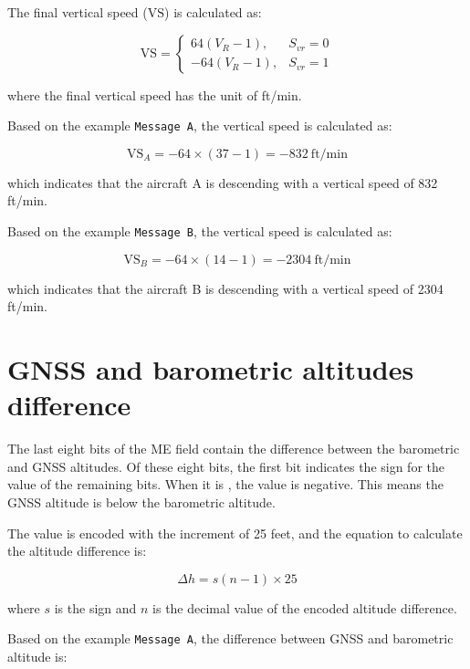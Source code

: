 The final vertical speed ($\mathrm{VS}$) is calculated as:

\begin{equation}
  \mathrm{VS} =   
   \begin{cases}
     64 (V_R - 1), & S_{vr} = 0 \\
     -64 (V_R - 1), & S_{vr} = 1
   \end{cases}
\end{equation}

where the final vertical speed has the unit of ft/min.

Based on the example \texttt{Message A}, the vertical speed is calculated as:

\begin{equation}
  \mathrm{VS}_A = -64 \times (37 -1) = -832 ~\text{ft/min}
\end{equation}

which indicates that the aircraft A is descending with a vertical speed of 832 ft/min.

Based on the example \texttt{Message B}, the vertical speed is calculated as:

\begin{equation}
  \mathrm{VS}_B = -64 \times (14 -1) = -2304 ~\text{ft/min}
\end{equation}

which indicates that the aircraft B is descending with a vertical speed of 2304 ft/min.


\section{GNSS and barometric altitudes difference}

The last eight bits of the ME field contain the difference between the barometric and GNSS altitudes. Of these eight bits, the first bit indicates the sign for the value of the remaining bits. When it is \1, the value is negative. This means the GNSS altitude is below the barometric altitude.

The value is encoded with the increment of 25 feet, and the equation to calculate the altitude difference is:

\begin{equation}
  \Delta h = s (n - 1) \times 25
\end{equation}

where $s$ is the sign and $n$ is the decimal value of the encoded altitude difference.

Based on the example \texttt{Message A}, the difference between GNSS and barometric altitude is:

